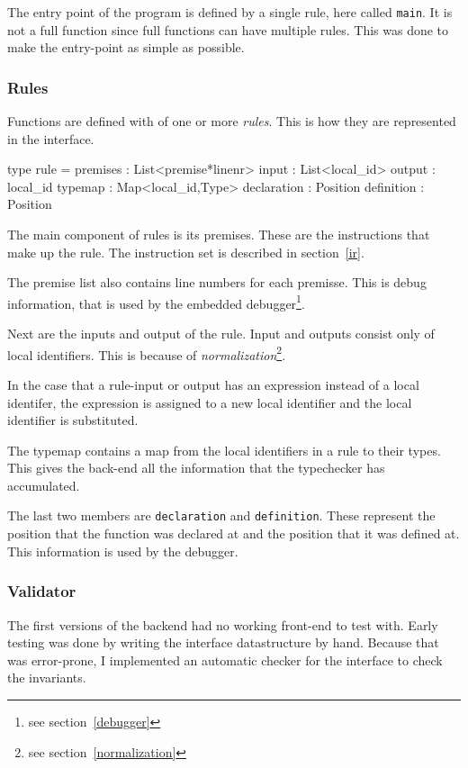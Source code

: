 The entry point of the program is defined by a single rule, here called \verb|main|.
It is not a full function since full functions can have multiple rules.
This was done to make the entry-point as simple as possible.

\subsubsection{Rules}

Functions are defined with of one or more \textit{rules}.
This is how they are represented in the interface.

\begin{FS}
type rule = {
  premises    : List<premise*linenr>
  input       : List<local_id>
  output      : local_id
  typemap     : Map<local_id,Type>
  declaration : Position
  definition  : Position
}
\end{FS}

The main component of rules is its premises.
These are the instructions that make up the rule.
The instruction set is described in section~\ref{ir}.

The premise list also contains line numbers for each premisse.
This is debug information, that is used by the embedded debugger\footnote{see section~\ref{debugger}}.

Next are the inputs and output of the rule.
Input and outputs consist only of local identifiers.
This is because of \textit{normalization}\footnote{see section~\ref{normalization}}.

In the case that a rule-input or output has an expression instead of a local identifer,
 the expression is assigned to a new local identifier and the local identifier is substituted.

The typemap contains a map from the local identifiers in a rule to their types.
This gives the back-end all the information that the typechecker has accumulated.

The last two members are \verb|declaration| and \verb|definition|.
These represent the position that the function was declared at and the position that it was defined at.
This information is used by the debugger.

\subsubsection{Validator}
The first versions of the backend had no working front-end to test with.
Early testing was done by writing the interface datastructure by hand.
Because that was error-prone, I implemented an automatic checker for the interface to check the invariants.

